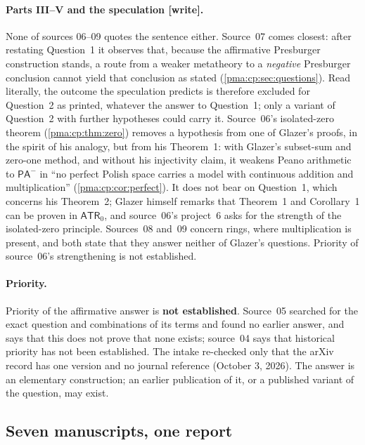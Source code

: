 \documentclass[11pt]{article}
\numberwithin{equation}{section}
\theoremstyle{definition}
\theoremstyle{remark}
\newcommand{\writetag}{\textup{\textsf{\small[write]}}}
\begin{document}
\paragraph{Parts III--V and the speculation \writetag.} None of sources 06--09
quotes the sentence either. Source~07 comes closest: after restating
Question~1 it observes that, because the affirmative Presburger construction
stands, a route from a weaker metatheory to a \emph{negative} Presburger
conclusion cannot yield that conclusion as stated
(\cref{pma:cp:sec:questions}). Read literally, the outcome the speculation
predicts is therefore excluded for Question~2 as printed, whatever the answer
to Question~1; only a variant of Question~2 with further hypotheses could
carry it. Source~06's isolated-zero theorem (\cref{pma:cp:thm:zero}) removes a
hypothesis from one of Glazer's proofs, in the spirit of his analogy, but from
his Theorem~1: with Glazer's subset-sum and zero-one method, and without his
injectivity claim, it weakens Peano arithmetic to $\mathsf{PA}^-$ in ``no
perfect Polish space carries a model with continuous addition and
multiplication'' (\cref{pma:cp:cor:perfect}). It does not bear on
Question~1, which concerns his Theorem~2; Glazer himself remarks
\cite[p.~7]{Glazer} that Theorem~1 and Corollary~1 can be proven in
$\mathsf{ATR}_0$, and source~06's project~6 asks for the strength of the
isolated-zero principle. Sources~08 and~09 concern rings, where
multiplication is present, and both state that they answer neither of
Glazer's questions. Priority of source~06's strengthening is not
established.

\paragraph{Priority.} Priority of the affirmative answer is \textbf{not
established}. Source~05 searched for the exact question and combinations of
its terms and found no earlier answer, and says that this does not prove that
none exists; source~04 says that historical priority has not been established.
The intake re-checked only that the arXiv record has one version and no
journal reference (October 3, 2026). The answer is an elementary
construction; an earlier publication of it, or a published variant of the
question, may exist.

\subsection{Seven manuscripts, one report}\label{pma:sec:sources}
\end{document}
